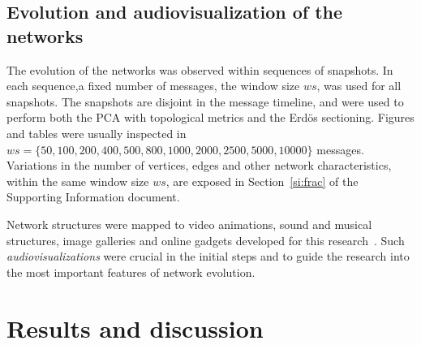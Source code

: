 \documentclass[%
	aip,
	jmp,%
	amsmath,amssymb,
	reprint,%
]{revtex4-1}
\begin{document}
\subsection{Evolution and audiovisualization of the networks}\label{sec:viz}
The evolution of the networks was observed within 
sequences of snapshots.
In each sequence,a fixed number of messages,
the window size $ws$, was used for all snapshots.
The snapshots are disjoint in the message timeline,
and were used to perform both the PCA
with topological metrics and the Erd\"os sectioning.  
Figures and tables were usually inspected in
$ws=\{50, 100, 200, 400, 500, 800, 1000, 2000, 2500, 5000, 10000\}$ messages.
Variations in the number of vertices, edges
and other network characteristics, within the same window size $ws$,
are exposed in Section~\ref{si:frac}
of the Supporting Information document. 

Network structures were mapped to video animations, sound and musical structures,
image galleries and online gadgets developed for this research~\cite{animacoes,galGmane,appGmane}.
Such \emph{audiovisualizations} were crucial in the initial steps and
to guide the research into the most important features of network evolution.

\section{Results and discussion}\label{sec:results}
\end{document}
